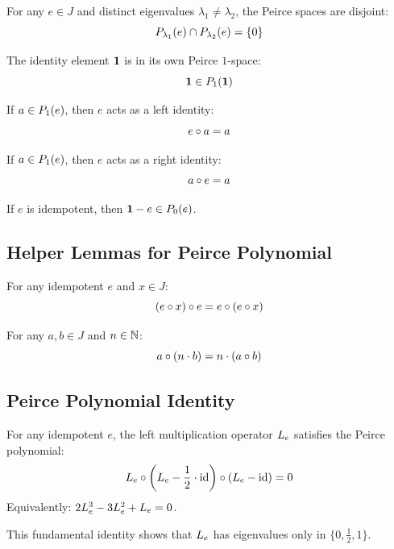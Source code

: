 \begin{theorem}
For any $e \in J$ and distinct eigenvalues $\lambda_1 \ne \lambda_2$, the Peirce spaces are disjoint:
\[ \Peirce{e}{\lambda_1} \cap \Peirce{e}{\lambda_2} = \{0\} \]
\end{theorem}

\begin{theorem}
The identity element $\jone$ is in its own Peirce $1$-space:
\[ \jone \in \Peirce{\jone}{1} \]
\end{theorem}

\begin{theorem}
If $a \in \Peirce{e}{1}$, then $e$ acts as a left identity:
\[ e \jmul a = a \]
\end{theorem}

\begin{theorem}
If $a \in \Peirce{e}{1}$, then $e$ acts as a right identity:
\[ a \jmul e = a \]
\end{theorem}

\begin{theorem}
If $e$ is idempotent, then $\jone - e \in \Peirce{e}{0}$.
\end{theorem}

\subsection{Helper Lemmas for Peirce Polynomial}

\begin{lemma}
For any idempotent $e$ and $x \in J$:
\[ (e \jmul x) \jmul e = e \jmul (e \jmul x) \]
\end{lemma}

\begin{lemma}
For any $a, b \in J$ and $n \in \N$:
\[ a \jmul (n \cdot b) = n \cdot (a \jmul b) \]
\end{lemma}

\subsection{Peirce Polynomial Identity}

\begin{theorem}
For any idempotent $e$, the left multiplication operator $\Lop{e}$ satisfies the Peirce polynomial:
\[ \Lop{e} \circ \left(\Lop{e} - \frac{1}{2} \cdot \mathrm{id}\right) \circ \left(\Lop{e} - \mathrm{id}\right) = 0 \]
Equivalently: $2\Lop{e}^3 - 3\Lop{e}^2 + \Lop{e} = 0$.

This fundamental identity shows that $\Lop{e}$ has eigenvalues only in $\{0, \frac{1}{2}, 1\}$.
\end{theorem}

